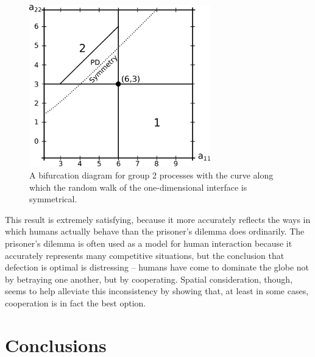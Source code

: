 \documentclass[notitlepage,reqno]{amsart}
\begin{document}
\begin{figure}[h]
\includegraphics[width=0.7\textwidth]{./images/1d_pd_plot.eps}
\caption{A bifurcation diagram for group 2 processes with the curve
  along which the random walk of the one-dimensional interface is
  symmetrical.}
\label{fig:pddiagram}
\end{figure}

This result is extremely satisfying, because it more accurately
reflects the ways in which humans actually behave than the prisoner's
dilemma does ordinarily. The prisoner's dilemma is often used as a
model for human interaction because it accurately represents many
competitive situations, but the conclusion that defection is optimal
is distressing -- humans have come to dominate the globe not by
betraying one another, but by cooperating. Spatial consideration,
though, seems to help alleviate this inconsistency by showing that, at
least in some cases, cooperation is in fact the best option.



\section{Conclusions}


% 

% 

\newpage

{}

\end{document}
